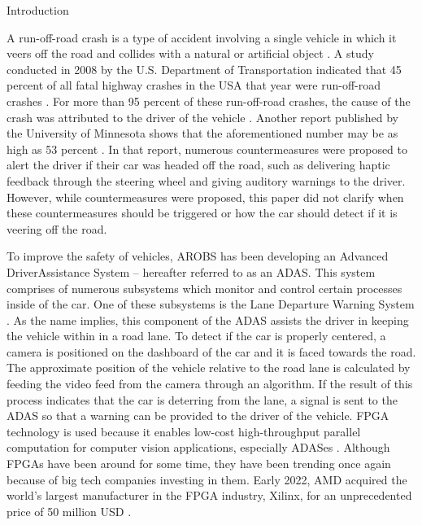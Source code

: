\documentclass{matthijs}
\begin{document}
	\begin{hoofdstuk}{Introduction}

		A run-off-road crash is a type of accident involving a single vehicle in which it veers off the road and collides with a natural or artificial object \cite{liu2009factors}.
		A study conducted in 2008 by the U.S. Department of Transportation indicated that 45 percent of all fatal highway crashes in the USA that year were run-off-road crashes \cite{dod2011run}.
		For more than 95 percent of these run-off-road crashes, the cause of the crash was attributed to the driver of the vehicle \cite{dod2011run}.
		Another report published by the University of Minnesota shows that the aforementioned number may be as high as 53 percent \cite{edwards2013pilot}.
		In that report, numerous countermeasures were proposed to alert the driver if their car was headed off the road, such as delivering haptic feedback through the steering wheel and giving auditory warnings to the driver.
		However, while countermeasures were proposed, this paper did not clarify when these countermeasures should be triggered or how the car should detect if it is veering off the road.
		
		\bigskip

		To improve the safety of vehicles, AROBS has been developing an Advanced Driver\Hyphdash Assistance System -- hereafter referred to as an ADAS.
		This system comprises of numerous subsystems which monitor and control certain processes inside of the car.
		One of these subsystems is the Lane Departure Warning System \cite{el2020novel}.
		As the name implies, this component of the ADAS assists the driver in keeping the vehicle within in a road lane.
		To detect if the car is properly centered, a camera is positioned on the dashboard of the car and it is faced towards the road.
		The approximate position of the vehicle relative to the road lane is calculated by feeding the video feed from the camera through an algorithm.
		If the result of this process indicates that the car is deterring from the lane, a signal is sent to the ADAS so that a warning can be provided to the driver of the vehicle.
		FPGA technology is used because it enables low-cost high-throughput parallel computation for computer vision applications, especially ADASes \cite{peri2020how}.
		Although FPGAs have been around for some time, they have been trending once again because of big tech companies investing in them.
		Early 2022, AMD acquired the world's largest \cite{valuates2021field} manufacturer in the FPGA industry, Xilinx, for an unprecedented price of 50 million USD \cite{lee2022amd}.
		

\end{hoofdstuk}
\end{document}
